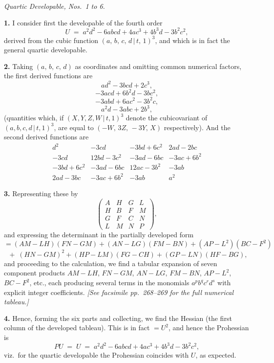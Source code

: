 \documentclass[11pt,a4paper]{article}
\providecommand{\mid}{\,|\,}
\begin{document}
\bigskip

\begin{center}
\textit{Quartic Developable, Nos.\ 1 to 6.}
\end{center}

\textbf{1.} I consider first the developable of the fourth order
\[
U \;=\; a^2 d^2 - 6abcd + 4ac^3 + 4b^3 d - 3b^2 c^2,
\]
derived from the cubic function $(a,\,b,\,c,\,d\mid t,\,1)^3$, and which is in fact the general quartic developable.

\medskip

\textbf{2.} Taking $(a,\,b,\,c,\,d)$ as coordinates and omitting common numerical factors, the first derived functions are
\[
ad^2 - 3bcd + 2c^3,
\]
\[
-3acd + 6b^2 d - 3bc^2,
\]
\[
-3abd + 6ac^2 - 3b^2 c,
\]
\[
a^2 d - 3abc + 2b^3,
\]
(quantities which, if $(X,Y,Z,W\mid t,1)^3$ denote the cubicovariant of $(a,b,c,d\mid t,1)^3$, are equal to $(-W,\,3Z,\,-3Y,\,X)$ respectively). And the second derived functions are
\[
\begin{array}{cccc}
d^2 & -3cd & -3bd + 6c^2 & 2ad - 2bc \\
-3cd & 12bd - 3c^2 & -3ad - 6bc & -3ac + 6b^2 \\
-3bd + 6c^2 & -3ad - 6bc & 12ac - 3b^2 & -3ab \\
2ad - 3bc & -3ac + 6b^2 & -3ab & a^2
\end{array}
\]

\medskip

\textbf{3.} Representing these by
\[
\begin{pmatrix} A & H & G & L \\ H & B & F & M \\ G & F & C & N \\ L & M & N & P \end{pmatrix},
\]
and expressing the determinant in the partially developed form
\[
= (AM - LH)(FN - GM) + (AN - LG)(FM - BN) + (AP - L^2)(BC - F^2)
\]
\[
\;+\; (HN - GM)^2 + (HP - LM)(FG - CH) + (GP - LN)(HF - BG),
\]
and proceeding to the calculation, we find a tabular expansion of seven component products $AM - LH$, $FN - GM$, $AN - LG$, $FM - BN$, $AP - L^2$, $BC - F^2$, etc., each producing several terms in the monomials $a^p b^q c^r d^s$ with explicit integer coefficients. \textit{[See facsimile pp.~268--269 for the full numerical tableau.]}

\medskip

\textbf{4.} Hence, forming the six parts and collecting, we find the Hessian (the first column of the developed tableau). This is in fact $= U^2$, and hence the Prohessian is
\[
PU \;=\; U \;=\; a^2 d^2 - 6abcd + 4ac^3 + 4b^3 d - 3b^2 c^2,
\]
viz.\ for the quartic developable the Prohessian coincides with $U$, as expected.
\end{document}
